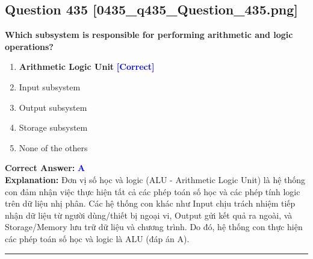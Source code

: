\documentclass[11pt,a4paper]{article}
\begin{document}
\begin{minipage}{\textwidth}
\subsection*{Question 435 \quad \footnotesize{[0435\_q435\_Question\_435.png]}}
\noindent \textbf{Which subsystem is responsible for performing arithmetic and logic operations?}

\begin{enumerate}[label=\Alph*.]
    \item \textbf{Arithmetic Logic Unit} \hfill \textcolor{blue}{\textbf{[Correct]}}
    \item Input subsystem
    \item Output subsystem
    \item Storage subsystem
    \item None of the others
\end{enumerate}

\noindent \textbf{Correct Answer:} \textcolor{blue}{\textbf{A}} \\[2pt]
\noindent \textbf{Explanation:} Đơn vị số học và logic (ALU - Arithmetic Logic Unit) là hệ thống con đảm nhận việc thực hiện tất cả các phép toán số học và các phép tính logic trên dữ liệu nhị phân. Các hệ thống con khác như Input chịu trách nhiệm tiếp nhận dữ liệu từ người dùng/thiết bị ngoại vi, Output gửi kết quả ra ngoài, và Storage/Memory lưu trữ dữ liệu và chương trình. Do đó, hệ thống con thực hiện các phép toán số học và logic là ALU (đáp án A).

\par\vspace{0.3cm}
\hrule
\vspace{0.3cm}
\end{minipage}
\end{document}
